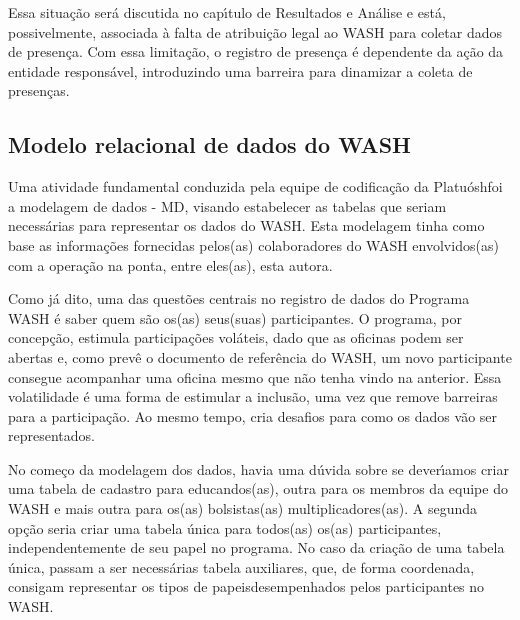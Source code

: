 \documentclass[
12pt,		%
openright,	%
twoside,  %
a4paper,			%
chapter=TITLE,		%
english,			%
french,				%
spanish,			%
brazil				%
]{USPSC-classe/USPSC}
\begin{document}
\noindent\begin{center}\mbox{\centering{}}\end{center}


Essa situa\c{c}\~ao ser\'a discutida no cap\'{\i}tulo de Resultados e An\'alise e est\'a, possivelmente, associada \`a falta de atribui\c{c}\~ao legal ao WASH para coletar dados de presen\c{c}a. Com essa limita\c{c}\~ao, o registro de presen\c{c}a \'e dependente da a\c{c}\~ao da entidade respons\'avel, introduzindo uma barreira para dinamizar a coleta de presen\c{c}as.








\subsection[Modelo relacional de dados do WASH]{Modelo relacional de dados do WASH}\label{Modelo relacional de dados do WASH}
Uma atividade fundamental conduzida pela equipe de codifica\c{c}\~ao da \textquotedbl Platu\'osh\textquotedbl  foi a modelagem de dados - MD, visando estabelecer as tabelas que seriam necess\'arias para representar os dados do WASH. Esta modelagem tinha como base as informa\c{c}\~oes fornecidas pelos(as) colaboradores do WASH envolvidos(as) com a opera\c{c}\~ao na ponta, entre eles(as), esta autora.








Como j\'a dito, uma das quest\~oes centrais no registro de dados do Programa WASH \'e saber quem s\~ao os(as) seus(suas) participantes. O programa, por concep\c{c}\~ao, estimula participa\c{c}\~oes vol\'ateis, dado que as oficinas podem ser abertas e, como prev\^e o documento de refer\^encia do WASH, um novo participante consegue acompanhar uma oficina mesmo que n\~ao tenha vindo na anterior. Essa volatilidade \'e uma forma de estimular a inclus\~ao, uma vez que remove barreiras para a participa\c{c}\~ao. Ao mesmo tempo, cria desafios para como os dados v\~ao ser representados.








No come\c{c}o da modelagem dos dados, havia uma d\'uvida sobre se dever\'{\i}amos criar uma tabela de cadastro para educandos(as), outra para os membros da equipe do WASH e mais outra para os(as) bolsistas(as) multiplicadores(as). A segunda op\c{c}\~ao seria criar uma tabela \'unica para todos(as) os(as) participantes, independentemente de seu papel no programa. No caso da cria\c{c}\~ao de uma tabela \'unica, passam a ser necess\'arias tabela auxiliares, que, de forma coordenada, consigam representar os \textquotedbl tipos de papeis\textquotedbl   desempenhados pelos participantes no WASH.
\end{document}

